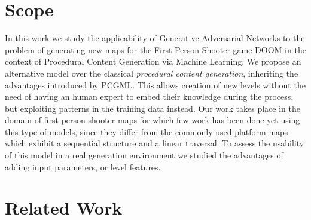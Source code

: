 \section{Scope}
In this work we study the applicability of Generative Adversarial Networks to the problem of generating new maps for the First Person Shooter game DOOM in the context of Procedural Content Generation via Machine Learning. We propose an alternative model over the classical \textit{procedural content generation}, inheriting the advantages introduced by PCGML. This allows creation of new levels without the need of having an human expert to embed their knowledge during the process, but exploiting patterns in the training data instead. Our work takes place in the domain of first person shooter maps for which few work has been done yet using this type of models, since they differ from the commonly used platform maps which exhibit a sequential structure and a linear traversal. To assess the usability of this model in a real generation environment we studied the advantages of adding input parameters, or level features.

\section{Related Work}
